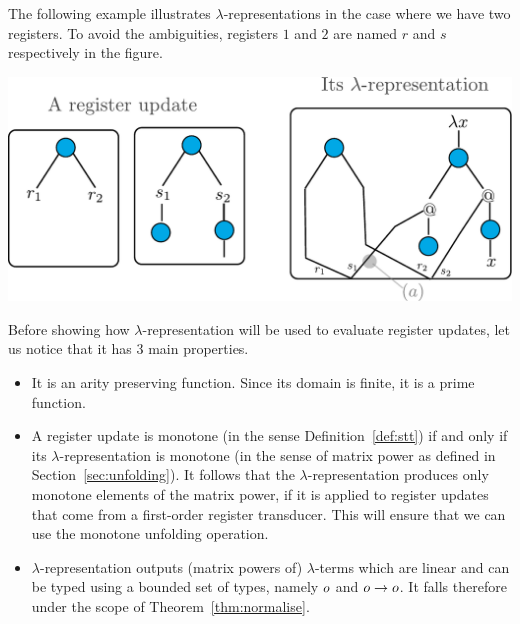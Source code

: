 The following example illustrates $\lambda$-representations in the case where we have two registers. To avoid the ambiguities, registers $1$ and $2$ are named $r$ and $s$ respectively in the figure.
\begin{center}
\includegraphics[scale=.33]{pictures/lambda-rep}

\end{center}
Before showing how $\lambda$-representation will be used to evaluate register updates,  let us notice that it has 3 main properties.
\begin{itemize}
\item It is an arity preserving function. Since its domain is finite, it is a prime function.
\item A register update is monotone (in the sense Definition~\ref{def:stt}) if and only if its $\lambda$-representation is monotone (in the sense of matrix power as defined in  Section~\ref{sec:unfolding}). It follows that the $\lambda$-representation produces only monotone elements of the matrix power, if it is applied to register updates that come from a first-order register transducer. 
This will ensure that we can use the monotone unfolding operation. 
\item $\lambda$-representation outputs (matrix powers of) $\lambda$-terms which are  linear and can be typed using a bounded set of types, namely $o$ and $o\to o$. It falls therefore under the scope of Theorem~\ref{thm:normalise}.
\end{itemize}

